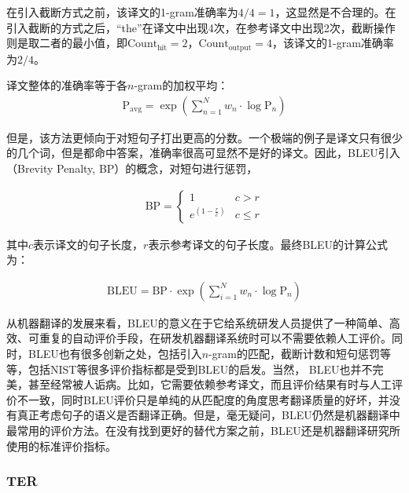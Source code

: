 \parinterval 在引入截断方式之前，该译文的1-gram准确率为$4/4=1$，这显然是不合理的。在引入截断的方式之后，``the''在译文中出现4次，在参考译文中出现2次，截断操作则是取二者的最小值，即$\textrm{Count}_{\textrm{hit}}= 2$，$\textrm{Count}_{\textrm{output}}= 4$，该译文的1-gram准确率为$2/4$。

\parinterval 译文整体的准确率等于各$n$-gram的加权平均：
\begin{eqnarray}
\textrm{P}_{\textrm{avg}}=\exp(\sum_{n=1}^Nw_n\cdot \log{\textrm{P}_n})
\label{eq:1-2}
\end{eqnarray}

\parinterval 但是，该方法更倾向于对短句子打出更高的分数。一个极端的例子是译文只有很少的几个词，但是都命中答案，准确率很高可显然不是好的译文。因此，BLEU引入{\small{}}（Brevity Penalty, BP）的概念，对短句进行惩罚，

\begin{eqnarray}
\textrm{BP}=
\begin{cases}
1& c>r\\
e^{(1-\frac{r}{c})}& c \le r
\end{cases}
\label{eq:1-3}
\end{eqnarray}

\noindent 其中$c$表示译文的句子长度，$r$表示参考译文的句子长度。最终BLEU的计算公式为：

\begin{eqnarray}
\textrm{BLEU}=\textrm{BP} \cdot \exp(\sum_{i=1}^{N}w_n \cdot \log{\textrm{P}_n})
\label{eq:1-4}
\end{eqnarray}

\parinterval 从机器翻译的发展来看，BLEU的意义在于它给系统研发人员提供了一种简单、高效、可重复的自动评价手段，在研发机器翻译系统时可以不需要依赖人工评价。同时，BLEU也有很多创新之处，包括引入$n$-gram的匹配，截断计数和短句惩罚等等，包括NIST等很多评价指标都是受到BLEU的启发。当然， BLEU也并不完美，甚至经常被人诟病。比如，它需要依赖参考译文，而且评价结果有时与人工评价不一致，同时BLEU评价只是单纯的从匹配度的角度思考翻译质量的好坏，并没有真正考虑句子的语义是否翻译正确。但是，毫无疑问，BLEU仍然是机器翻译中最常用的评价方法。在没有找到更好的替代方案之前，BLEU还是机器翻译研究所使用的标准评价指标。


\subsubsection{TER}

